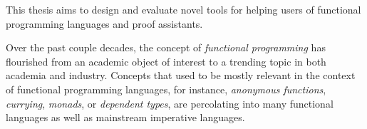 This thesis aims to design and evaluate novel tools for helping users of
functional programming languages and proof assistants.

Over the past couple decades, the concept of \emph{functional programming} has
flourished from an academic object of interest to a trending topic in both
academia and industry.  Concepts that used to be mostly relevant in the context
of functional programming languages, for instance, \emph{anonymous functions},
\emph{currying}, \emph{monads}, or \emph{dependent types}, are percolating into
many functional languages as well as mainstream imperative languages.
